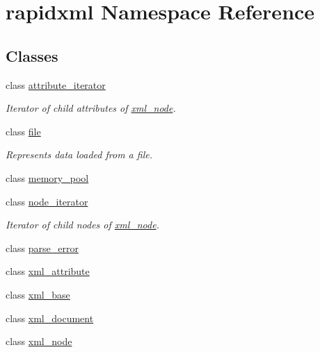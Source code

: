 \hypertarget{namespacerapidxml}{}\section{rapidxml Namespace Reference}
\label{namespacerapidxml}
\subsection*{Classes}
\begin{DoxyCompactItemize}
\item 
class \hyperlink{classrapidxml_1_1attribute__iterator}{attribute\+\_\+iterator}
\begin{DoxyCompactList}\small\item\em Iterator of child attributes of \hyperlink{classrapidxml_1_1xml__node}{xml\+\_\+node}. \end{DoxyCompactList}\item 
class \hyperlink{classrapidxml_1_1file}{file}
\begin{DoxyCompactList}\small\item\em Represents data loaded from a file. \end{DoxyCompactList}\item 
class \hyperlink{classrapidxml_1_1memory__pool}{memory\+\_\+pool}
\item 
class \hyperlink{classrapidxml_1_1node__iterator}{node\+\_\+iterator}
\begin{DoxyCompactList}\small\item\em Iterator of child nodes of \hyperlink{classrapidxml_1_1xml__node}{xml\+\_\+node}. \end{DoxyCompactList}\item 
class \hyperlink{classrapidxml_1_1parse__error}{parse\+\_\+error}
\item 
class \hyperlink{classrapidxml_1_1xml__attribute}{xml\+\_\+attribute}
\item 
class \hyperlink{classrapidxml_1_1xml__base}{xml\+\_\+base}
\item 
class \hyperlink{classrapidxml_1_1xml__document}{xml\+\_\+document}
\item 
class \hyperlink{classrapidxml_1_1xml__node}{xml\+\_\+node}
\end{DoxyCompactItemize}

